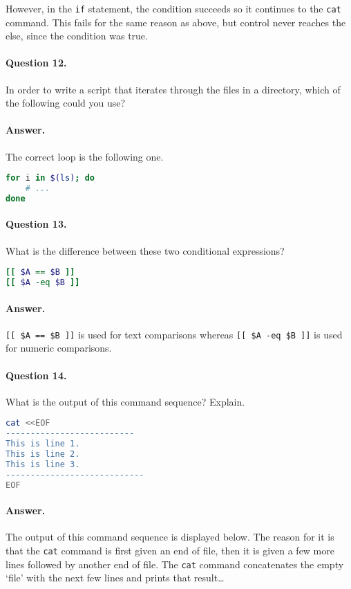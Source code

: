 \documentclass{article}
\begin{document}
However, in the \verb`if` statement, the condition succeeds so it continues to the \verb`cat` command. This fails for the same reason as above, but control never reaches the else, since the condition was true.

\paragraph{Question 12.} In order to write a script that iterates through the files in a directory, which of the following could you use?

\paragraph{Answer.} The correct loop is the following one.

\begin{lstlisting}[language=bash]
for i in $(ls); do
	# ...
done
\end{lstlisting}

\paragraph{Question 13.} What is the difference between these two conditional expressions?

\begin{lstlisting}[language=bash]
[[ $A == $B ]]
[[ $A -eq $B ]]
\end{lstlisting}

\paragraph{Answer.} \verb`[[ $A == $B ]]` is used for text comparisons whereas \texttt{[[ \$A -eq \$B ]]} is used for numeric comparisons.

\paragraph{Question 14.} What is the output of this command sequence? Explain.

\begin{lstlisting}[language=bash]
cat <<EOF
--------------------------
This is line 1.
This is line 2.
This is line 3.
----------------------------
EOF
\end{lstlisting}

\paragraph{Answer.} The output of this command sequence is displayed below. The reason for it is that the \verb`cat` command is first given an end of file, then it is given a few more lines followed by another end of file. The \verb`cat` command concatenates the empty `file' with the next few lines and prints that result\dots
\end{document}
